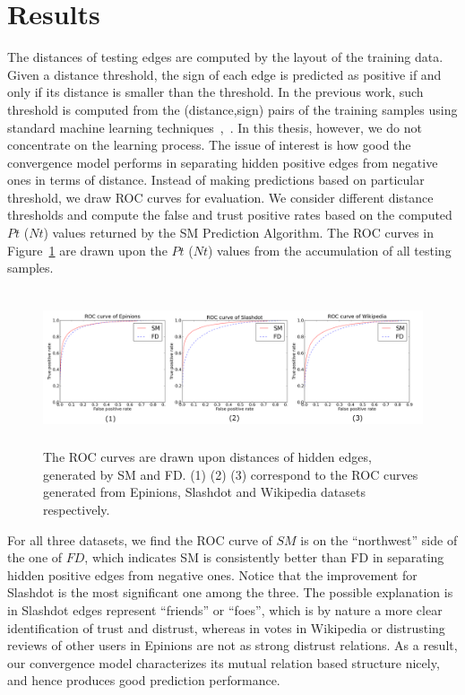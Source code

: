 \section{Results}
The distances of testing edges are computed by the
layout of the training data. Given a distance threshold, the sign of
each edge is predicted as positive if and only if its distance is
smaller than the threshold. In the previous work, such threshold is
computed from the (distance,sign) pairs of the training samples using
standard machine learning
techniques~\cite{Leskovec:2010},~\cite{golbeck:distrust2011}. In this
thesis, however, we do not concentrate on the learning process. The
issue of interest is how good the convergence model performs in
separating hidden positive edges from negative ones in terms of
distance. Instead of making predictions based on particular threshold,
we draw ROC curves for evaluation. We consider different distance
thresholds and compute the false and trust positive rates based on the
computed $Pt$ ($Nt$) values returned by the SM Prediction Algorithm. The ROC curves in Figure~\ref{fig:ROC} are drawn upon the
$Pt$ ($Nt$) values from the accumulation of all testing samples.
\begin{figure}[th]
\centering
\includegraphics[height=1.8in]{Figs/ROC_curve.pdf}
\caption{\label{fig:ROC}The ROC curves are drawn upon
  distances of hidden edges, generated by SM and FD. (1) (2) (3)
  correspond to the ROC curves generated from Epinions, Slashdot and
  Wikipedia datasets respectively.}
\end{figure}

For all three datasets, we find the ROC curve of $SM$ is on the
``northwest'' side of the one of $FD$, which indicates SM is
consistently better than FD in separating hidden positive edges from
negative ones. Notice that the improvement for Slashdot is the most
significant one among the three. The possible explanation is in
Slashdot edges represent ``friends'' or ``foes'', which is by nature a
more clear identification of trust and distrust, whereas in votes in
Wikipedia or distrusting reviews of other users in Epinions are not as
strong distrust relations.  As a result, our convergence model
characterizes its mutual relation based structure nicely, and hence
produces good prediction performance.

